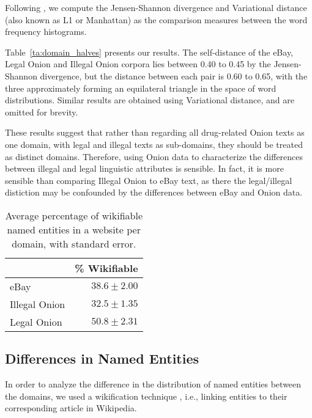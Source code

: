 \documentclass[11pt,a4paper,table]{article}
\newcommand{\oa}[1]{\footnote{\color{red}OA: #1}}
\begin{document}
    Following \citet{Plank2011EffectiveMO}, we compute the Jensen-Shannon divergence and Variational distance (also known as L1 or Manhattan) as the comparison measures between the word frequency histograms.
    
    Table~\ref{ta:domain_halves} presents our results.
    The self-distance of the eBay, Legal Onion and Illegal Onion corpora lies between 0.40 to 0.45
    by the Jensen-Shannon divergence, but the distance between each pair is 0.60 to 0.65, with the three approximately forming an equilateral triangle
    in the space of word distributions.
    Similar results are obtained using Variational distance, and are omitted for brevity.

    These results suggest that rather than regarding all drug-related Onion texts as one domain, with legal and illegal texts as sub-domains, 
      they should be treated as distinct domains.
    Therefore, using Onion data to characterize the differences between illegal and legal linguistic attributes is sensible. 
    In fact, it is more sensible than comparing Illegal Onion to eBay text, as there the legal/illegal distiction may be confounded by the differences
      between eBay and Onion data.

\begin{table}
\begin{center}
\begin{tabular}{l|r}
 & \% Wikifiable\\
 \hline
eBay & $38.6 \pm2.00$\\
Illegal Onion & $32.5 \pm1.35$\\
Legal Onion & $50.8 \pm2.31$
\end{tabular}
\end{center}
\caption{Average percentage of wikifiable named entities in a website per domain, with standard error.\label{ta:wiki}}
\end{table}


\subsection{Differences in Named Entities}

    In order to analyze the difference in the distribution of 
    named entities between the domains,  we used a wikification technique \cite{bunescu2006using}, i.e., linking entities to their corresponding article in Wikipedia.
\end{document}
